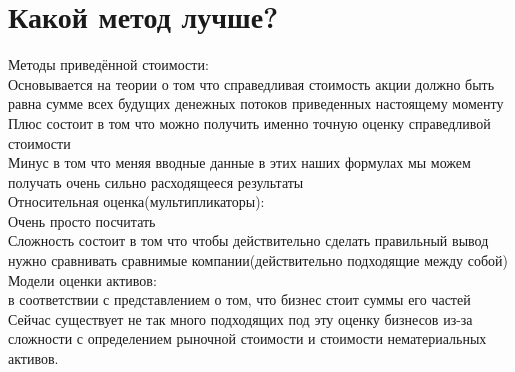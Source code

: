 \documentclass{article}
\begin{document}
\section{Какой метод лучше?}
Методы приведённой стоимости:\\
 Основывается на теории о том что справедливая стоимость акции должно быть равна сумме всех будущих денежных потоков приведенных настоящему моменту\\
 Плюс состоит в том что можно получить именно точную оценку справедливой стоимости \\
 Минус в том что меняя вводные данные в этих наших формулах мы можем получать очень сильно расходящееся результаты\\
Относительная оценка(мультипликаторы):\\
Очень просто посчитать\\
Сложность состоит в том что чтобы действительно сделать правильный вывод нужно сравнивать сравнимые компании(действительно подходящие между собой)\\
Модели оценки активов:\\
в соответствии с представлением о том, что бизнес стоит суммы его частей\\
Сейчас существует не так много подходящих под эту оценку бизнесов из-за сложности с определением рыночной стоимости и стоимости нематериальных активов.
\end{document}
